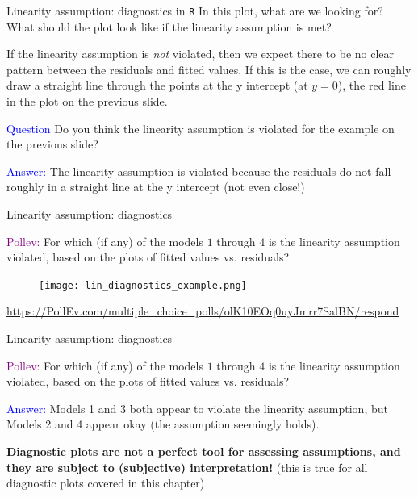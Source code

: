 \documentclass[10pt,t]{beamer}
\begin{document}
\begin{frame}{Linearity assumption: diagnostics in \texttt{R}}
In this plot, what are we looking for? What should the plot look like if the linearity assumption is met?\pause

\vspace{0.3cm}

If the linearity assumption is \textit{not} violated, then we expect there to be no clear pattern between the residuals and fitted values. If this is the case, we can roughly draw a straight line through the points at the y intercept (at $y = 0$), the red line in the plot on the previous slide. 

\vspace{0.3cm}

\textcolor{blue}{Question} Do you think the linearity assumption is violated for the example on the previous slide? \pause

\vspace{0.3cm}

\textcolor{blue}{Answer:} The linearity assumption is violated because the residuals do not fall roughly in a straight line at the y intercept (not even close!)

\end{frame}


\begin{frame}{Linearity assumption: diagnostics}
	\vspace{-5 mm}
	
\textcolor{purple}{Pollev:} For which (if any) of the models $1$ through $4$ is the linearity assumption violated, based on the plots of fitted values vs. residuals?

\begin{figure}
\centering \texttt{[image: lin\_diagnostics\_example.png]}
\end{figure}

\footnotesize{\url{https://PollEv.com/multiple_choice_polls/olK10EOq0uyJmrr7SalBN/respond}}
\end{frame}

\begin{frame}{Linearity assumption: diagnostics}
	\vspace{-5 mm}

\textcolor{purple}{Pollev:} For which (if any) of the models $1$ through $4$ is the linearity assumption violated, based on the plots of fitted values vs. residuals?

\vspace{0.3cm}

\textcolor{blue}{Answer:} Models 1 and 3 both appear to violate the linearity assumption, but Models 2 and 4 appear okay (the assumption seemingly holds). 

\vspace{0.3cm}

\textbf{Diagnostic plots are not a perfect tool for assessing assumptions, and they are subject to (subjective) interpretation!} (this is true for all diagnostic plots covered in this chapter)
\end{frame}
\end{document}
